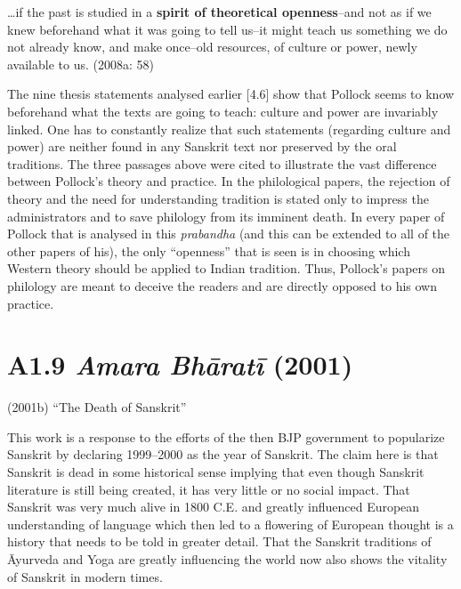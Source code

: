 \begin{myquote}
…if the past is studied in a \textbf{spirit of theoretical openness}–and not as if we knew beforehand what it was going to tell us–it might teach us something we do not already know, and make once–old resources, of culture or power, newly available to us. (2008a: 58)
\end{myquote}

The nine thesis statements analysed earlier [4.6] show that Pollock seems to know beforehand what the texts are going to teach: culture and power are invariably linked. One has to constantly realize that such statements (regarding culture and power) are neither found in any Sanskrit text nor preserved by the oral traditions. The three passages above were cited to illustrate the vast difference between Pollock’s theory and practice. In the philological papers, the rejection of theory and the need for understanding tradition is stated only to impress the administrators and to save philology from its imminent death. In every paper of Pollock that is analysed in this \textit{prabandha }(and this can be extended to all of the other papers of his), the only “openness” that is seen is in choosing which Western theory should be applied to Indian tradition. Thus, Pollock’s papers on philology are meant to deceive the readers and are directly opposed to his own practice.

\vspace{-.3cm}

\section*{A1.9 \textit{Amara Bhāratī} (2001)}

(2001b) “The Death of Sanskrit”

This work is a response to the efforts of the then BJP government to popularize Sanskrit by declaring 1999–2000 as the year of Sanskrit. The claim here is that Sanskrit is dead in some historical sense implying that even though Sanskrit literature is still being created, it has very little or no social impact. That Sanskrit was very much alive in 1800 C.E. and greatly influenced European understanding of language which then led to a flowering of European thought is a history that needs to be told in greater detail. That the Sanskrit traditions of Āyurveda and Yoga are greatly influencing the world now also shows the vitality of Sanskrit in modern times.

\vspace{-.3cm}

